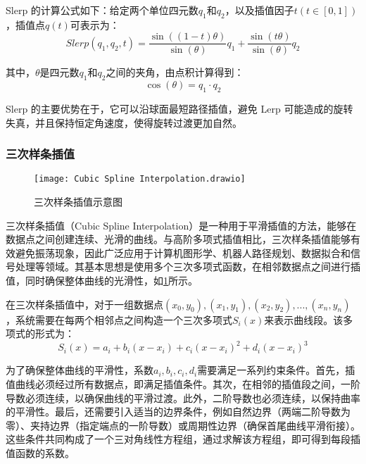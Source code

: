 Slerp 的计算公式如下：给定两个单位四元数$q_{1}$和$q_{2}$，以及插值因子$t(t\in[0,1])$，插值点$q(t)$可表示为：
\begin{equation}
	\label{equ:Slerp:1}
	Slerp(q_{1},q_{2},t)=\frac{\sin((1-t)\theta)}{\sin(\theta)}q_{1} + \frac{\sin(t\theta)}{\sin(\theta)}q_{2}
\end{equation}

其中，$\theta$是四元数$q_{1}$和$q_{2}$之间的夹角，由点积计算得到：
\begin{equation}
	\label{equ:Slerp:2}
	\cos(\theta)=q_{1} \cdot{q_{2}}
\end{equation}

Slerp 的主要优势在于，它可以沿球面最短路径插值，避免 Lerp 可能造成的旋转失真，并且保持恒定角速度，使得旋转过渡更加自然。
\subsubsection{三次样条插值}  
 \begin{figure}[htb]
	\texttt{[image: Cubic Spline Interpolation.drawio]}
	\caption[三次样条插值示意图]{三次样条插值示意图} %
	\label{fig:Cubic Spline Interpolation.drawio}
\end{figure}
三次样条插值（Cubic Spline Interpolation）是一种用于平滑插值的方法，能够在数据点之间创建连续、光滑的曲线。与高阶多项式插值相比，三次样条插值能够有效避免振荡现象，因此广泛应用于计算机图形学、机器人路径规划、数据拟合和信号处理等领域。其基本思想是使用多个三次多项式函数，在相邻数据点之间进行插值，同时确保整体曲线的光滑性，如\cref{fig:Cubic Spline Interpolation.drawio}所示。

在三次样条插值中，对于一组数据点$(x_{0},y_{0}),(x_{1},y_{1}),(x_{2},y_{2}),...,(x_{n},y_{n})$，系统需要在每两个相邻点之间构造一个三次多项式$S_{i}(x)$来表示曲线段。该多项式的形式为：
\begin{equation}
	\label{equ:Cubic Spline Interpolation 1}
	S_{i}(x) = a_{i} + b_{i}(x-x_{i}) + c_{i}(x-x_{i})^{2} + d_{i}(x-x_{i})^{3}  
\end{equation}

为了确保整体曲线的平滑性，系数$a_{i},b_{i},c_{i},d_{i}$需要满足一系列约束条件。首先，插值曲线必须经过所有数据点，即满足插值条件。其次，在相邻的插值段之间，一阶导数必须连续，以确保曲线的平滑过渡。此外，二阶导数也必须连续，以保持曲率的平滑性。最后，还需要引入适当的边界条件，例如自然边界（两端二阶导数为零）、夹持边界（指定端点的一阶导数）或周期性边界（确保首尾曲线平滑衔接）。这些条件共同构成了一个三对角线性方程组，通过求解该方程组，即可得到每段插值函数的系数。

